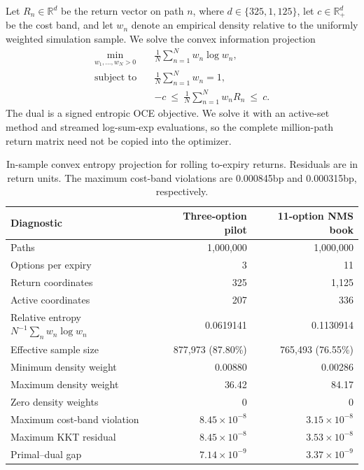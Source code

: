\documentclass[11pt,a4paper]{article}
\begin{document}
Let $R_n\in\mathbb R^d$ be the return vector on path $n$, where
$d\in\{325,1{,}125\}$, let $c\in\mathbb R_+^d$ be the cost band, and let
$w_n$ denote an empirical
density relative to the uniformly weighted simulation sample.  We solve the
convex information projection
\begin{equation}
\begin{aligned}
  \min_{w_1,\ldots,w_N>0}\quad
    &\frac1N\sum_{n=1}^N w_n\log w_n,\\
  \text{subject to}\quad
    &\frac1N\sum_{n=1}^N w_n=1,\\
    &-c\ \leq\ \frac1N\sum_{n=1}^N w_nR_n\ \leq\ c.
\end{aligned}
\label{eq:fixed-sample-entropy}
\end{equation}
The dual is a signed entropic OCE objective.  We solve it with an active-set
method and streamed log-sum-exp evaluations, so the complete million-path
return matrix need not be copied into the optimizer.

\begin{table}[H]
\centering
\small
\begin{tabular}{lrr}
\toprule
Diagnostic & Three-option pilot & 11-option NMS book\\
\midrule
Paths & 1,000,000 & 1,000,000\\
Options per expiry & 3 & 11\\
Return coordinates & 325 & 1,125\\
Active coordinates & 207 & 336\\
Relative entropy $N^{-1}\sum_n w_n\log w_n$
  & 0.0619141 & 0.1130914\\
Effective sample size & 877,973 (87.80\%) & 765,493 (76.55\%)\\
Minimum density weight & 0.00880 & 0.00286\\
Maximum density weight & 36.42 & 84.17\\
Zero density weights & 0 & 0\\
Maximum cost-band violation & $8.45\times10^{-8}$ & $3.15\times10^{-8}$\\
Maximum KKT residual & $8.45\times10^{-8}$ & $3.53\times10^{-8}$\\
Primal--dual gap & $7.14\times10^{-9}$ & $3.37\times10^{-9}$\\
\bottomrule
\end{tabular}
\caption{In-sample convex entropy projection for rolling to-expiry returns.
Residuals are in return units.  The maximum cost-band violations are
0.000845bp and 0.000315bp, respectively.}
\label{tab:fixed-sample-entropy}
\end{table}
\end{document}
